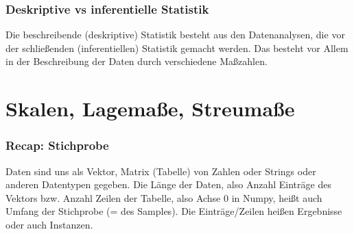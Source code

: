 \begin{frame}
  \frametitle{Deskriptive vs inferentielle Statistik}

  Die beschreibende (deskriptive) Statistik besteht aus den Datenanalysen, die vor der schließenden (inferentiellen) Statistik gemacht werden. Das besteht vor Allem in der Beschreibung der Daten durch verschiedene Maßzahlen.

  \vspace{0.5cm}
  
\end{frame}

\section{Skalen, Lagemaße, Streumaße}

\begin{frame}
  \frametitle{Recap: Stichprobe}

  Daten sind uns als Vektor, Matrix (Tabelle) von Zahlen oder Strings oder anderen Datentypen gegeben.
  Die \alert{Länge} der Daten, also Anzahl Einträge des Vektors bzw. Anzahl Zeilen der Tabelle, also \alert{Achse 0} in Numpy, heißt auch \alert{Umfang der Stichprobe} (= des \alert{Samples}). Die Einträge/Zeilen heißen \alert{Ergebnisse} oder auch \alert{Instanzen}.

  \vspace{0.5cm}

  
  \vspace{0.5cm}

\end{frame}

